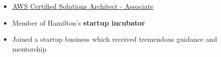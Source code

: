  


\begin{itemize}
    \item \href{https://tianyizhangawscert.s3.amazonaws.com/AWS+Certified+Solutions+Architect+-+Associate+certificate.pdf}{AWS Certified Solutions Architect - Associate}
\end{itemize}

\vspace{-2mm}
\begin{itemize}
 \item Member of Hamilton’s \textbf{startup incubator}
 \item Joined a startup business which received tremendous guidance and mentorship

\end{itemize}



\medskip


